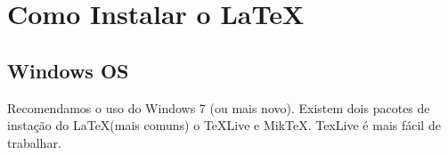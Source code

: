 \chapter{Como Instalar o \LaTeX}

\ifpdf
	\graphicspath{{Appendix1/Figs/Raster/}{Appendix1/Figs/PDF/}{Appendix1/Figs/}}
\else
	\graphicspath{{Appendix1/Figs/Vector/}{Appendix1/Figs/}}
\fi

\section*{Windows OS}

Recomendamos o uso do Windows 7 (ou mais novo). Existem dois pacotes de instação do \LaTeX  (mais comuns) o TeXLive e MikTeX. TexLive é mais fácil de trabalhar.

